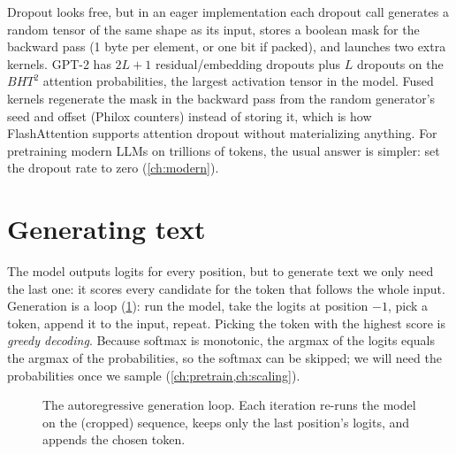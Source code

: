 \begin{deepdive}
Dropout looks free, but in an eager implementation each dropout call generates a random tensor of the
same shape as its input, stores a boolean mask for the backward pass (1 byte per element, or one bit if
packed), and launches two extra kernels. GPT-2 has $2L+1$ residual/embedding dropouts plus $L$ dropouts
on the $BHT^2$ attention probabilities, the largest activation tensor in the model. Fused kernels
regenerate the mask in the backward pass from the random generator's seed and offset (Philox counters)
instead of storing it, which is how FlashAttention supports attention dropout without materializing
anything. For pretraining modern LLMs on trillions of tokens, the usual answer is simpler: set the
dropout rate to zero (\cref{ch:modern}).
\end{deepdive}

\section{Generating text}\label{sec:gpt:generate}

The model outputs logits for every position, but to generate text we only need the last one: it
scores every candidate for the token that follows the whole input. Generation is a loop
(\cref{fig:gpt:genloop}): run the model, take the logits at position $-1$, pick a token, append it
to the input, repeat. Picking the token with the highest score is \emph{greedy decoding}. Because
softmax is monotonic, the argmax of the logits equals the argmax of the probabilities, so the softmax
can be skipped; we will need the probabilities once we sample (\cref{ch:pretrain,ch:scaling}).

\begin{figure}[t]
\centering
{}
\caption{The autoregressive generation loop. Each iteration re-runs the model on the (cropped)
sequence, keeps only the last position's logits, and appends the chosen token.}
\label{fig:gpt:genloop}
\end{figure}


